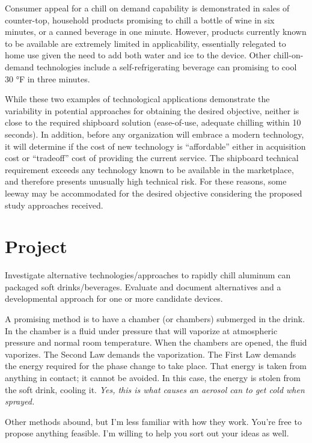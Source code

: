 \documentclass[]{tufte-book}
\begin{document}
Consumer appeal for a chill on demand capability is demonstrated in sales of counter-top, household products promising to chill a bottle of wine in six minutes, or a canned beverage in one minute. However, products currently known to be available are extremely limited in applicability, essentially relegated to home use given the need to add both water and ice to the device. Other chill-on-demand technologies include a self-refrigerating beverage can promising to cool 30 °F in three minutes.

While these two examples of technological applications demonstrate the variability in potential approaches for obtaining the desired objective, neither is close to the required shipboard solution (ease-of-use, adequate chilling within 10 seconds). In addition, before any organization will embrace a modern technology, it will determine if the cost of new technology is ``affordable'' either in acquisition cost or ``tradeoff'' cost of providing the current service. The shipboard technical requirement exceeds any technology known to be available in the marketplace, and therefore presents unusually high technical risk. For these reasons, some leeway may be accommodated for the desired objective considering the proposed study approaches received.

\hypertarget{project}{%
\section{Project}\label{project}}

Investigate alternative technologies/approaches to rapidly chill aluminum can packaged soft drinks/beverages. Evaluate and document alternatives and a developmental approach for one or more candidate devices.

A promising method is to have a chamber (or chambers) submerged in the drink. In the chamber is a fluid under pressure that will vaporize at atmospheric pressure and normal room temperature. When the chambers are opened, the fluid vaporizes. The Second Law demands the vaporization. The First Law demands the energy required for the phase change to take place. That energy is taken from anything in contact; it cannot be avoided. In this case, the energy is stolen from the soft drink, cooling it. \emph{Yes, this is what causes an aerosol can to get cold when sprayed.}

Other methods abound, but I'm less familiar with how they work. You're free to propose anything feasible. I'm willing to help you sort out your ideas as well.
\end{document}
